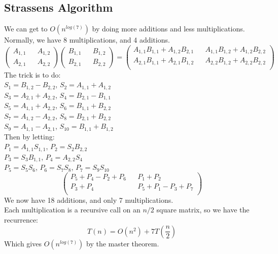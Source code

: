 \documentclass[12pt]{article}
\theoremstyle{definition}
\begin{document}
\subsection{Strassens Algorithm}
We can get to $O(n^{log(7)})$ by doing more additions and less multiplications. Normally, we have 8 multiplications, and 4 additions.
\\ \linebreak
$$
\begin{pmatrix}
A_{1,1} && A_{1,2} \\
A_{2,1} && A_{2,2}
\end{pmatrix}
\begin{pmatrix}
B_{1,1} && B_{1,2} \\
B_{2,1} && B_{2,2}
\end{pmatrix}
= \begin{pmatrix}
A_{1,1}B_{1,1} + A_{1,2}B_{2,1} && A_{1,1}B_{1,2} + A_{1,2}B_{2,2} \\
A_{2,1}B_{1,1} + A_{2,1}B_{1,2} &&
A_{2,2}B_{1,2} + A_{2,2}B_{2,2}\\
\end{pmatrix}
$$
The trick is to do:\\
$S_1 = B_{1,2}-B_{2,2}$, $S_2 = A_{1,1}+A_{1,2}$\\
$S_3 = A_{2,1} + A_{2,2}$, $S_4 = B_{2,1} - B_{1, 1}$\\
$S_5 = A_{1,1} + A_{2,2}$, $S_6 = B_{1,1}+ B_{2,2}$\\
$S_7 = A_{1,2} - A_{2,2}$, $S_8 = B_{2,1} + B_{2,2}$\\
$S_9 = A_{1,1} - A_{2,1}$, $S_{10} = B_{1,1} + B_{1,2}$
\\ \linebreak
Then by letting:\\
$P_1 = A_{1,1}S_{1,1}$, $P_2 = S_2B_{2,2}$\\
 $P_3 = S_3B_{1,1}$, $P_4 = A_{2,2}S_{4}$\\
 $P_5 = S_5S_6$, $P_6 = S_7S_8$, $P_7 = S_9S_10$
$$\begin{pmatrix}
P_5 + P_4 - P_2 + P_6 && P_1 + P_2 \\
P_3 + P_4 && P_5 + P_1 - P_3 + P_7 \\
\end{pmatrix}$$
We now have 18 additions, and only 7 multiplications.
\\ \linebreak
Each multiplication is a recursive call on an $n/2$ square matrix, so we have the recurrence:
$$T(n) = O(n^2) + 7T(\frac{n}{2})$$
Which gives $O(n^{log(7)})$ by the master theorem.
\\ \linebreak
\end{document}

